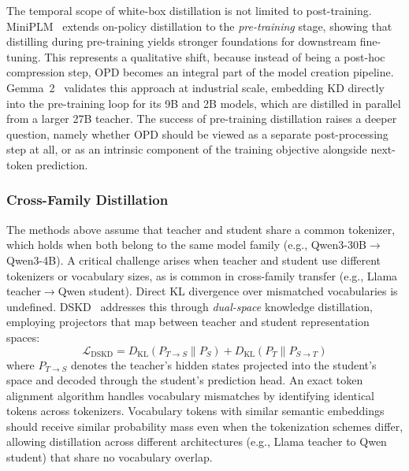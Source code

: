 \documentclass{article} %
\newcommand{\KL}{D_{\mathrm{KL}}}
\begin{document}
The temporal scope of white-box distillation is not limited to post-training. MiniPLM~\citep{2410.17215} extends on-policy distillation to the \emph{pre-training} stage, showing that distilling during pre-training yields stronger foundations for downstream fine-tuning. This represents a qualitative shift, because instead of being a post-hoc compression step, OPD becomes an integral part of the model creation pipeline. Gemma~2~\citep{2408.00118} validates this approach at industrial scale, embedding KD directly into the pre-training loop for its 9B and 2B models, which are distilled in parallel from a larger 27B teacher. The success of pre-training distillation raises a deeper question, namely whether OPD should be viewed as a separate post-processing step at all, or as an intrinsic component of the training objective alongside next-token prediction.

\subsubsection{Cross-Family Distillation}
\label{subsubsec:cross_family}

The methods above assume that teacher and student share a common tokenizer, which holds when both belong to the same model family (e.g., Qwen3-30B$\to$Qwen3-4B). A critical challenge arises when teacher and student use different tokenizers or vocabulary sizes, as is common in cross-family transfer (e.g., Llama teacher$\to$Qwen student). Direct KL divergence over mismatched vocabularies is undefined. DSKD~\citep{2504.11426} addresses this through \emph{dual-space} knowledge distillation, employing projectors that map between teacher and student representation spaces:
\begin{equation}
    \mathcal{L}_{\text{DSKD}} = \KL(P_{T \to S} \parallel P_S) + \KL(P_T \parallel P_{S \to T})
\end{equation}
where $P_{T \to S}$ denotes the teacher's hidden states projected into the student's space and decoded through the student's prediction head. An exact token alignment algorithm handles vocabulary mismatches by identifying identical tokens across tokenizers. Vocabulary tokens with similar semantic embeddings should receive similar probability mass even when the tokenization schemes differ, allowing distillation across different architectures (e.g., Llama teacher to Qwen student) that share no vocabulary overlap.
\end{document}
